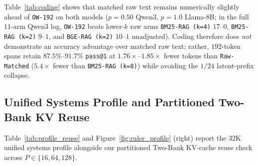 \documentclass[10pt]{article}
\renewcommand{\_}{\origunderscore\allowbreak}
\begin{document}
Table~\ref{tab:coding} shows that matched raw text remains numerically slightly ahead of \texttt{OW-192} on both models ($p=0.50$ Qwen3, $p=1.0$ Llama-8B; in the full $11$-arm Qwen3 log, \texttt{OW-192} beats lower-$k$ raw arms \texttt{BM25-RAG (k=4)} $17$--$0$, \texttt{BM25-RAG (k=2)} $9$--$1$, and \texttt{BGE-RAG (k=2)} $10$--$1$ unadjusted). Coding therefore does \emph{not} demonstrate an accuracy advantage over matched raw text; rather, $192$-token spans retain $87.5\%$--$91.7\%$ \texttt{pass@1} at $1.76\times$--$1.85\times$ fewer tokens than \texttt{Raw-Matched} ($5.4\times$ fewer than \texttt{BM25-RAG (k=8)}) while avoiding the $1/24$ latent-prefix collapse.

\subsection{Unified Systems Profile and Partitioned Two-Bank KV Reuse}
\label{sec:twobank}
Table~\ref{tab:profile_reuse} and Figure~\ref{fig:ruler_profile} (right) report the $32\text{K}$ unified systems profile alongside our partitioned Two-Bank KV-cache reuse check across $P \in \{16, 64, 128\}$.
\end{document}
